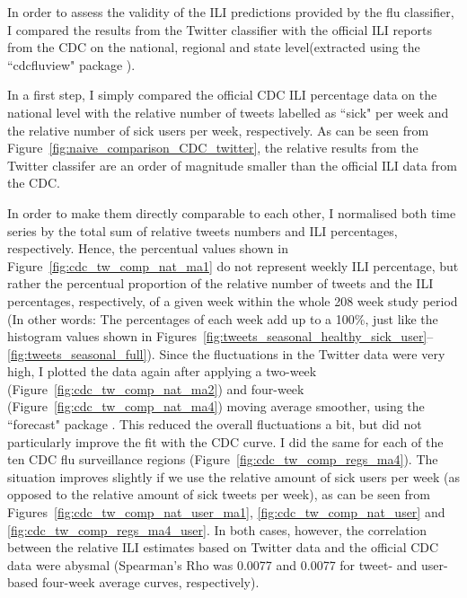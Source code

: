 \documentclass[11pt, a4paper,twoside]{report}\usepackage[]{graphicx}\usepackage[]{color}
\begin{document}
In order to assess the validity of the ILI predictions provided by the flu classifier, I compared the results from the Twitter classifier with the official ILI reports from the CDC on the national, regional and state level(extracted using the ``cdcfluview" package \citep{cdcfluview}).

In a first step, I simply compared the official CDC ILI percentage data on the national level with the relative number of tweets labelled as ``sick" per week and the relative number of sick users per week, respectively. As can be seen from Figure~\ref{fig:naive_comparison_CDC_twitter}, the relative results from the Twitter classifer are an order of magnitude smaller than the official ILI data from the CDC.

In order to make them directly comparable to each other, I normalised both time series by the total sum of relative tweets numbers and ILI percentages, respectively. Hence, the percentual values shown in Figure~\ref{fig:cdc_tw_comp_nat_ma1} do not represent weekly ILI percentage, but rather the percentual proportion of the relative number of tweets and the ILI percentages, respectively, of a given week within the whole 208 week study period (In other words: The percentages of each week add up to a 100\%, just like the histogram values shown in Figures~\ref{fig:tweets_seasonal_healthy_sick_user}--\ref{fig:tweets_seasonal_full}). Since the fluctuations in the Twitter data were very high, I plotted the data again after applying a two-week (Figure~\ref{fig:cdc_tw_comp_nat_ma2}) and four-week (Figure~\ref{fig:cdc_tw_comp_nat_ma4}) moving average smoother, using the ``forecast" package \citep{forecast}. This reduced the overall fluctuations a bit, but did not particularly improve the fit with the CDC curve. I did the same for each of the ten CDC flu surveillance regions (Figure~\ref{fig:cdc_tw_comp_regs_ma4}). The situation improves slightly if we use the relative amount of sick users per week (as opposed to the relative amount of sick tweets per week), as can be seen  from Figures~\ref{fig:cdc_tw_comp_nat_user_ma1}, \ref{fig:cdc_tw_comp_nat_user} and \ref{fig:cdc_tw_comp_regs_ma4_user}. In both cases, however, the correlation between the relative ILI estimates based on Twitter data and the official CDC data were abysmal (Spearman's Rho was 0.0077 and 0.0077 for tweet- and user-based four-week average curves, respectively). 
\end{document}
